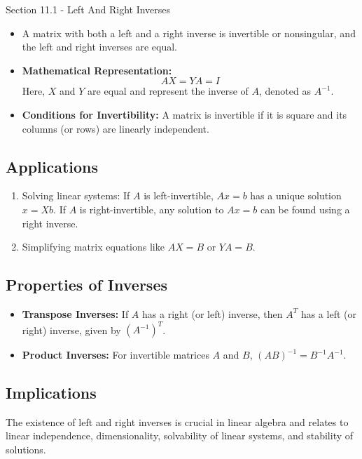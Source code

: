 \begin{notes}{Section 11.1 - Left And Right Inverses}
    \begin{highlight}[Invertibility]
        \begin{itemize}
            \item A matrix with both a left and a right inverse is invertible or nonsingular, and the left and right inverses are equal.
            \item \textbf{Mathematical Representation:} 
            \begin{equation*}
                AX = YA = I
            \end{equation*}
            Here, $X$ and $Y$ are equal and represent the inverse of $A$, denoted as $A^{-1}$.
            \item \textbf{Conditions for Invertibility:} A matrix is invertible if it is square and its columns (or rows) are linearly independent.
        \end{itemize}
    \end{highlight}

    \subsection*{Applications}
    \begin{enumerate}
        \item Solving linear systems: If $A$ is left-invertible, $Ax = b$ has a unique solution $x = Xb$. If $A$ is right-invertible, any solution to $Ax = b$ can be found using a right inverse.
        \item Simplifying matrix equations like $AX = B$ or $YA = B$.
    \end{enumerate}

    \subsection*{Properties of Inverses}
    \begin{itemize}
        \item \textbf{Transpose Inverses:} If $A$ has a right (or left) inverse, then $A^T$ has a left (or right) inverse, given by $(A^{-1})^T$.
        \item \textbf{Product Inverses:} For invertible matrices $A$ and $B$, $(AB)^{-1} = B^{-1}A^{-1}$.
    \end{itemize}

    \subsection*{Implications}
    The existence of left and right inverses is crucial in linear algebra and relates to linear independence, dimensionality, solvability of linear systems, and stability of solutions.
\end{notes}

